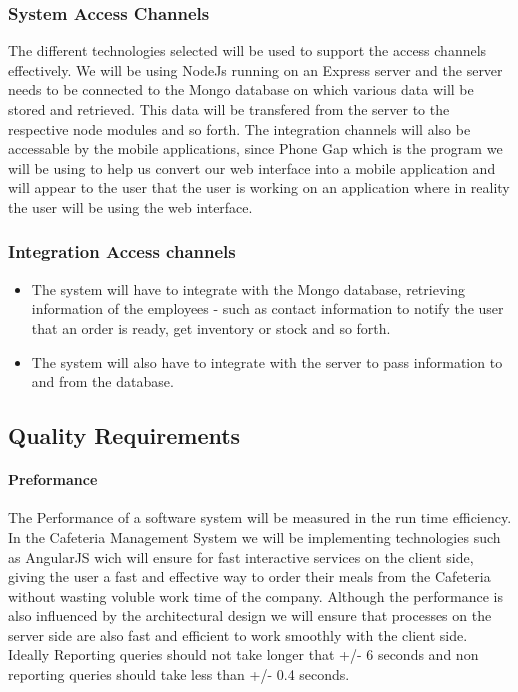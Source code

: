 \documentclass[12pt]{article}
\begin{document}
\subsubsection{System Access Channels}
The different technologies selected will be used to support the access channels effectively. We will be using NodeJs running on an Express server and the server needs to be connected to the Mongo database on which various data will be stored and retrieved. This data will be transfered from the server to the respective node modules and so forth. 
The integration channels will also be accessable by the mobile applications, since Phone Gap which is the program we will be using to help us convert our web interface into a mobile application and will appear to the user that the user is working on an application where in reality the user will be using the web interface. 

\subsubsection{Integration Access channels}

\begin{itemize}

\item The system will have to integrate with the Mongo database, retrieving information of the employees - such as contact information to notify the user that an order is ready, get inventory or stock and so forth. 

\item The system will also have to integrate with the server to pass information to and from the database.
\end{itemize}




\subsection{Quality Requirements}

\paragraph{ Preformance\\}
The Performance of a software system will be measured in the run time efficiency.  In the Cafeteria Management System we will be implementing technologies such as AngularJS wich will ensure for fast interactive services on the client side, giving the user a fast and effective way to order their meals from the Cafeteria without wasting voluble work time of the company.  Although the performance is also influenced by the architectural design we will ensure that processes on the server side are also fast and efficient to work smoothly with the client side. Ideally Reporting queries should not take longer that +/- 6 seconds and non reporting queries should take less than +/- 0.4 seconds. 
\end{document}
